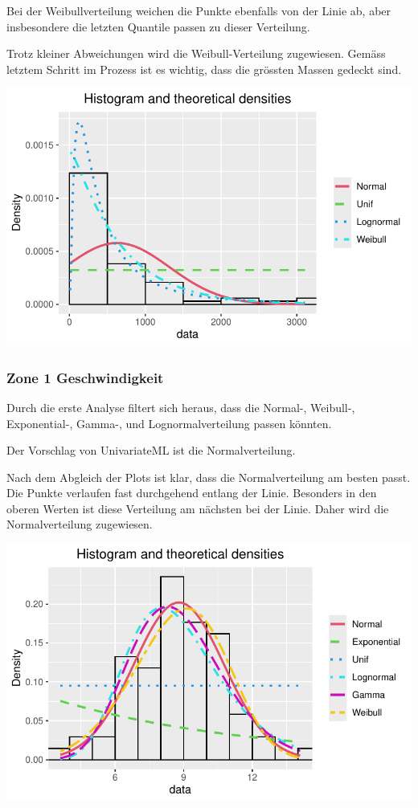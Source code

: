 \documentclass[
  letterpaper,
  DIV=11,
  numbers=noendperiod]{scrartcl}
\begin{document}
Bei der Weibullverteilung weichen die Punkte ebenfalls von der Linie ab,
aber insbesondere die letzten Quantile passen zu dieser Verteilung.

Trotz kleiner Abweichungen wird die Weibull-Verteilung zugewiesen.
Gemäss letztem Schritt im Prozess ist es wichtig, dass die grössten
Massen gedeckt sind.

\includegraphics{steinschlag_bericht_files/figure-pdf/unnamed-chunk-4-1.pdf}

\subsubsection{Zone 1 Geschwindigkeit}\label{zone-1-geschwindigkeit}

Durch die erste Analyse filtert sich heraus, dass die Normal-, Weibull-,
Exponential-, Gamma-, und Lognormalverteilung passen könnten.

Der Vorschlag von UnivariateML ist die Normalverteilung.

Nach dem Abgleich der Plots ist klar, dass die Normalverteilung am
besten passt. Die Punkte verlaufen fast durchgehend entlang der Linie.
Besonders in den oberen Werten ist diese Verteilung am nächsten bei der
Linie. Daher wird die Normalverteilung zugewiesen.

\includegraphics{steinschlag_bericht_files/figure-pdf/unnamed-chunk-6-1.pdf}
\end{document}
